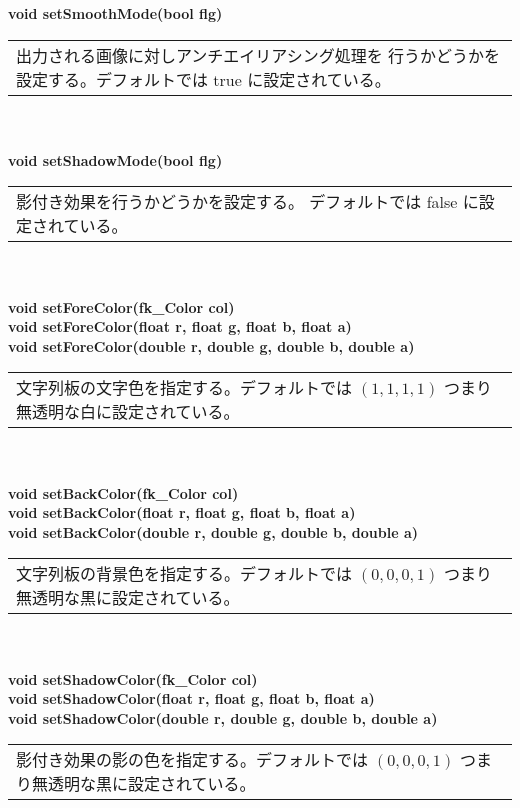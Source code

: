 \begin{tabbing}
\> \textbf{void setSmoothMode(bool flg)} \\
	\> \> \begin{tabular}{p{15cm}}
		出力される画像に対しアンチエイリアシング処理を
		行うかどうかを設定する。デフォルトでは true に設定されている。
	\end{tabular} \\ \\

\> \textbf{void setShadowMode(bool flg)} \\
	\> \> \begin{tabular}{p{15cm}}
		影付き効果を行うかどうかを設定する。
		デフォルトでは false に設定されている。
	\end{tabular} \\ \\

\> \textbf{void setForeColor(fk\_Color col)} \\
\> \textbf{void setForeColor(float r, float g, float b, float a)} \\
\> \textbf{void setForeColor(double r, double g, double b, double a)} \\
	\> \> \begin{tabular}{p{15cm}}
		文字列板の文字色を指定する。デフォルトでは
		\((1, 1, 1, 1)\) つまり無透明な白に設定されている。
	\end{tabular} \\ \\

\> \textbf{void setBackColor(fk\_Color col)} \\
\> \textbf{void setBackColor(float r, float g, float b, float a)} \\
\> \textbf{void setBackColor(double r, double g, double b, double a)} \\
	\> \> \begin{tabular}{p{15cm}}
		文字列板の背景色を指定する。デフォルトでは
		\((0, 0, 0, 1)\) つまり無透明な黒に設定されている。
	\end{tabular} \\ \\

\> \textbf{void setShadowColor(fk\_Color col)} \\
\> \textbf{void setShadowColor(float r, float g, float b, float a)} \\
\> \textbf{void setShadowColor(double r, double g, double b, double a)} \\
	\> \> \begin{tabular}{p{15cm}}
		影付き効果の影の色を指定する。デフォルトでは
		\((0, 0, 0, 1)\) つまり無透明な黒に設定されている。
	\end{tabular} \\ \\


\end{tabbing}
